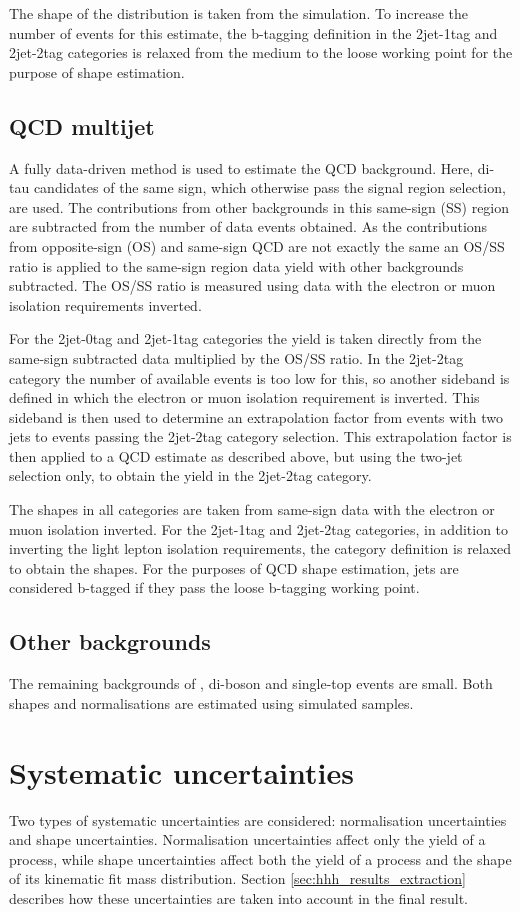 The shape of the \Wjets distribution is taken from the simulation. To 
increase the number of events for this estimate, the b-tagging definition
in the 2jet-1tag and 2jet-2tag categories is relaxed from the medium to the loose 
working point for the purpose of shape estimation.
\subsection{QCD multijet}
\label{sec:hhh_backgrounds_qcd}
A fully data-driven method is used to estimate the QCD background. Here, di-tau candidates
of the same sign, which otherwise pass the signal region selection, are used. 
The contributions from other backgrounds
in this same-sign (SS) region are subtracted from the number of data events obtained.
As the contributions from opposite-sign (OS) and same-sign QCD are
not exactly the same an OS/SS ratio is applied to the same-sign region data yield with other backgrounds subtracted.
The OS/SS ratio is measured using data with 
the electron or muon isolation requirements inverted. 

For the 2jet-0tag and 2jet-1tag categories the yield is taken directly from
the same-sign subtracted data multiplied by the OS/SS ratio. In the 2jet-2tag
category the number of available events is too low for this, so another sideband is defined
in which the electron or muon isolation requirement is inverted. This 
sideband is then used to determine an extrapolation factor from events
with two jets to events passing the 2jet-2tag category selection. This extrapolation
factor is then applied to a QCD estimate as described above, but using the two-jet 
selection only, to obtain the yield in the 2jet-2tag category.

The shapes in all categories are taken from same-sign data with the electron or muon
isolation inverted. For the 2jet-1tag and 2jet-2tag categories, in addition to 
inverting the light lepton isolation requirements, the category definition
is relaxed to obtain the shapes. For the purposes of QCD shape
estimation, jets are considered b-tagged if they pass the loose b-tagging
working point.
\subsection{Other backgrounds}
\label{sec:hhh_backgrounds_other}
The remaining backgrounds of \Zellell, di-boson and single-top
events are small. Both shapes and normalisations are
estimated using simulated samples.
 
\section{Systematic uncertainties}
\label{sec:hhh_uncs}
Two types of systematic uncertainties are considered: normalisation
uncertainties and shape uncertainties. Normalisation uncertainties affect only
the yield of a process, while shape uncertainties affect both the yield of a process and the 
shape of its kinematic fit mass distribution. 
Section \ref{sec:hhh_results_extraction}
describes how these uncertainties are taken into account in the final result.
